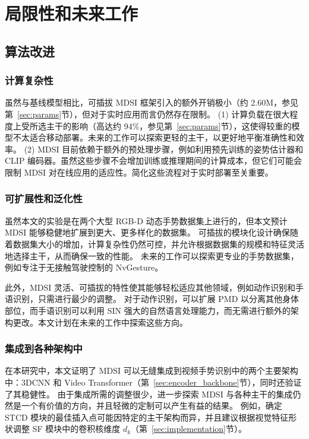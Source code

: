
\chapter{局限性和未来工作}
\label{sec:limitations}
\section{算法改进}
\subsection{计算复杂性}
虽然与基线模型相比，可插拔 MDSI 框架引入的额外开销极小（约 2.60M，参见第~\ref{sec:params}节），但对于实时应用而言仍然存在限制。
(1) 计算负载在很大程度上受所选主干的影响（高达约 94\%，参见第~\ref{sec:params}节），这使得较重的模型不太适合移动部署。未来的工作可以探索更轻的主干，以更好地平衡准确性和效率。 (2) MDSI 目前依赖于额外的预处理步骤，例如利用预先训练的姿势估计器和 CLIP 编码器。虽然这些步骤不会增加训练或推理期间的计算成本，但它们可能会限制 MDSI 对在线应用的适应性。简化这些流程对于实时部署至关重要。

\subsection{可扩展性和泛化性}
虽然本文的实验是在两个大型 RGB-D 动态手势数据集上进行的，但本文预计 MDSI 能够稳健地扩展到更大、更多样化的数据集。
可插拔的模块化设计确保随着数据集大小的增加，计算复杂性仍然可控，并允许根据数据集的规模和特征灵活地选择主干，从而确保一致的性能。
未来的工作可以探索更专业的手势数据集，例如专注于无接触驾驶控制的 NvGesture。

此外，MDSI 灵活、可插拔的特性使其能够轻松适应其他领域，例如动作识别和手语识别，只需进行最少的调整。
对于动作识别，可以扩展 PMD 以分离其他身体部位，而手语识别可以利用 SIN 强大的自然语言处理能力，而无需进行额外的架构更改。本文计划在未来的工作中探索这些方向。

\subsection{集成到各种架构中}
在本研究中，本文证明了 MDSI 可以无缝集成到视频手势识别中的两个主要架构中：3DCNN 和 Video Transformer（第~\ref{sec:encoder_backbone}节），同时还验证了其稳健性。
由于集成所需的调整很少，进一步探索 MDSI 与各种主干的集成仍然是一个有价值的方向，并且轻微的定制可以产生有益的结果。
例如，确定 STCD 模块的最佳插入点可能因特定的主干架构而异，并且建议根据视觉特征形状调整 SF 模块中的卷积核维度 \(d_k\)（第~\ref{sec:implementation}节）。

